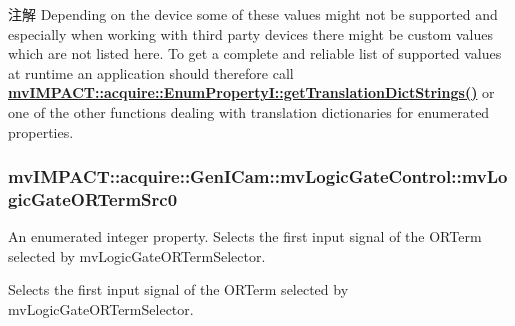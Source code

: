 \begin{DoxyNote}{注解}
Depending on the device some of these values might not be supported and especially when working with third party devices there might be custom values which are not listed here. To get a complete and reliable list of supported values at runtime an application should therefore call {\bfseries \hyperlink{classmv_i_m_p_a_c_t_1_1acquire_1_1_enum_property_i_a0ba6ccbf5ee69784d5d0b537924d26b6}{mv\+I\+M\+P\+A\+C\+T\+::acquire\+::\+Enum\+Property\+I\+::get\+Translation\+Dict\+Strings()}} or one of the other functions dealing with translation dictionaries for enumerated properties. 
\end{DoxyNote}
\hypertarget{classmv_i_m_p_a_c_t_1_1acquire_1_1_gen_i_cam_1_1mv_logic_gate_control_aedff5baffbe81054b6e2d043664d8bbb}{
\subsubsection[{mv\+Logic\+Gate\+O\+R\+Term\+Src0}]{ mv\+I\+M\+P\+A\+C\+T\+::acquire\+::\+Gen\+I\+Cam\+::mv\+Logic\+Gate\+Control\+::mv\+Logic\+Gate\+O\+R\+Term\+Src0}}\label{classmv_i_m_p_a_c_t_1_1acquire_1_1_gen_i_cam_1_1mv_logic_gate_control_aedff5baffbe81054b6e2d043664d8bbb}


An enumerated integer property. Selects the first input signal of the O\+R\+Term selected by mv\+Logic\+Gate\+O\+R\+Term\+Selector. 

Selects the first input signal of the O\+R\+Term selected by mv\+Logic\+Gate\+O\+R\+Term\+Selector.

